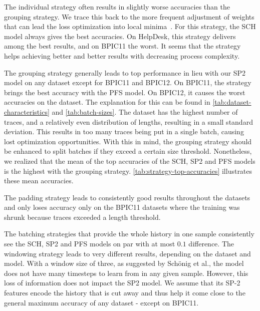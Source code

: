 The individual strategy often results in slightly worse accuracies than the grouping strategy. We trace this back to the more frequent adjustment of weights that can lead the loss optimization into local minima~\cite{keskar2016large}. For this strategy, the SCH model always gives the best accuracies. On HelpDesk, this strategy delivers among the best results, and on BPIC11 the worst. It seems that the strategy helps achieving better and better results with decreasing process complexity.

The grouping strategy generally leads to top performance in lieu with our SP2 model on any dataset except for BPIC11 and BPIC12. On BPIC11, the strategy brings the best accuracy with the PFS model. On BPIC12, it causes the worst accuracies on the dataset. The explanation for this can be found in \autoref{tab:dataset-characteristics} and \autoref{tab:batch-sizes}. The dataset has the highest number of traces, and a relatively even distribution of lengths, resulting in a small standard deviation. This results in too many traces being put in a single batch, causing lost optimization opportunities. With this in mind, the grouping strategy should be enhanced to split batches if they exceed a certain size threshold. Nonetheless, we realized that the mean of the top accuracies of the SCH, SP2 and PFS models is the highest with the grouping strategy. \autoref{tab:strategy-top-accuracies} illustrates these mean accuracies.

The padding strategy leads to consistently good results throughout the datasets and only loses accuracy only on the BPIC11 datasets where the training was shrunk because traces exceeded a length threshold.

The batching strategies that provide the whole history in one sample consistently see the SCH, SP2 and PFS models on par with at most $0.1$ difference. The windowing strategy leads to very different results, depending on the dataset and model. With a window size of three, as suggested by Schönig et al., the model does not have many timesteps to learn from in any given sample. However, this loss of information does not impact the SP2 model. We assume that its SP-2 features encode the history that is cut away and thus help it come close to the general maximum accuracy of any dataset - except on BPIC11.

